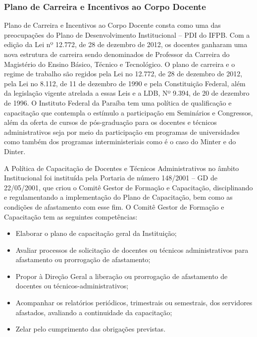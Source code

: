 \subsubsection{Plano de Carreira e Incentivos ao Corpo Docente}

Plano de Carreira e Incentivos ao Corpo Docente consta como uma das preocupações do Plano de Desenvolvimento Institucional – PDI do IFPB. Com a edição da Lei nº 12.772, de 28 de dezembro de 2012, os docentes ganharam uma nova estrutura de carreira sendo denominados de Professor da Carreira do Magistério do Ensino Básico, Técnico e Tecnológico. O plano de carreira e o regime de trabalho são regidos pela Lei no 12.772, de 28 de dezembro de 2012, pela Lei no 8.112, de 11 de dezembro de 1990 e pela Constituição Federal, além da legislação vigente atrelada a essas Leis e a LDB, Nº 9.394, de 20 de dezembro de 1996. O Instituto Federal da Paraíba tem uma política de qualificação e capacitação que contempla o estímulo a participação em Seminários e Congressos, além da oferta de cursos de pós-graduação para os docentes e técnicos administrativos seja por meio da participação em programas de universidades como também dos programas interministeriais como é o caso do Minter e do Dinter.

A Política de Capacitação de Docentes e Técnicos Administrativos no âmbito Institucional foi instituída pela Portaria de n\'umero 148/2001 – GD de 22/05/2001, que criou o Comitê Gestor de Formação e Capacitação, disciplinando e regulamentando a implementação do Plano de Capacitação, bem como as condições de afastamento com esse fim. O Comitê Gestor de Formação e Capacitação tem as seguintes competências:

\begin{itemize}
\item Elaborar o plano de capacitação geral da Instituição;
\item Avaliar processos de solicitação de docentes ou técnicos administrativos para afastamento ou prorrogação de afastamento;
\item Propor à Direção Geral a liberação ou prorrogação de afastamento de docentes ou técnicos-administrativos;
\item Acompanhar os relatórios periódicos, trimestrais ou semestrais, dos servidores afastados, avaliando a continuidade da capacitação;
\item Zelar pelo cumprimento das obrigações previstas.
\end{itemize}

